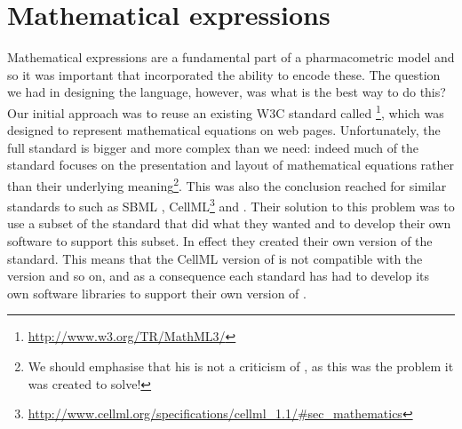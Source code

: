 \section{Mathematical expressions}
\label{sec:maths}
Mathematical expressions are a fundamental part of a pharmacometric
model and so it was important that \pharmml incorporated the
ability to encode these. The question we had in designing the language, however, was
what is the best way to do this?  Our initial approach was to reuse an
existing W3C standard called
\mathml\footnote{\url{http://www.w3.org/TR/MathML3/}}, which was
designed to represent mathematical equations on web pages.
Unfortunately, the full \mathml standard is bigger and more complex
than we need: indeed much of the standard focuses on the presentation
and layout of mathematical equations rather than their underlying
meaning\footnote{We should emphasise that his is not a criticism of
\mathml, as this was the problem it was created to solve!}.  This
was also the conclusion reached for similar standards to \pharmml such as
SBML \cite[Section 3.4]{sbmll3v1c},
CellML\footnote{\url{http://www.cellml.org/specifications/cellml_1.1/\#sec_mathematics}}
and \sedml \cite{sedmll1v1}. Their solution to this problem was to use
a subset of the standard that did what they wanted and to develop their
own software to support this subset. In effect they created their own
version of the \mathml standard. This means that the CellML version of
\mathml is not compatible with the \sbml version and so on, and as a
consequence each standard has had to develop its own software
libraries to support their own version of \mathml.

